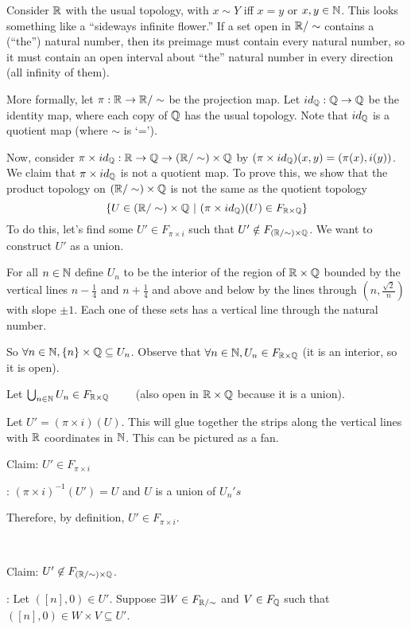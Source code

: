 Consider $\mathbb R$ with the usual topology, with $x\sim Y$ iff $x=y$ or $x,y\in \mathbb N$. This looks something like a ``sideways infinite flower.'' \placeholder If a set open in $\mathbb R/\sim$ contains a (``the'') natural number, then its preimage must contain every natural number, so it must contain an open interval about ``the'' natural number in every direction (all infinity of them). 

More formally, let $\pi:\mathbb R\to\mathbb R/\sim$ be the projection map. Let $id_\mathbb Q:\mathbb Q\to\mathbb Q$ be the identity map, where each copy of $\mathbb Q$ has the usual topology. Note that $id_\mathbb Q$ is a quotient map (where $\sim$ is `='). 

Now, consider $\pi\times id_\mathbb Q:\mathbb R\to\mathbb Q\to(\mathbb R/\sim)\times\mathbb Q$ by $(\pi\times id_\mathbb Q)(x,y) = (\pi(x), i(y))$. We claim that $\pi\times id_\mathbb Q$ is not a quotient map. To prove this, we show that the product topology on $(\mathbb R/\sim)\times\mathbb Q$ is not the same as the quotient topology
\[ \{ U\in (\mathbb R/\sim)\times\mathbb Q\ |\ (\pi\times id_\mathbb Q)(U)\in F_{\mathbb R\times\mathbb Q} \} \]
To do this, let's find some $U' \in F_{\pi \times i}$ such that $U' \notin F_{(\mathbb R/\sim) \times \mathbb Q}$. We want to construct $U'$ as a union.

For all $n\in \mathbb N$ define $U_n$ to be the interior of the region of $\mathbb R\times\mathbb Q$ bounded by the vertical lines $n-\frac{1}{4}$ and $n+\frac{1}{4}$ and above and below by the lines through $(n, \frac{\sqrt{2}}{n})$ with slope $\pm 1$. Each one of these sets has a vertical line through the natural number.

So $\forall n \in \mathbb N, \{n\}\times \mathbb Q \subseteq U_n$. Observe that $\forall n\in \mathbb N, U_n \in F_{\mathbb R\times\mathbb Q}$ (it is an interior, so it is open).

Let $\bigcup_{n \in\mathbb N} U_n \in F_{\mathbb R\times\mathbb Q} \qquad$ (also open in $\mathbb R\times\mathbb Q$ because it is a union).

Let $U' = (\pi \times i)(U).$ This will glue together the strips along the vertical lines with $\mathbb R$ coordinates in $\mathbb N$. This can be pictured as a fan. \placeholder

Claim: $U' \in F_{\pi \times i}$

\proof: $(\pi \times i)^{-1}(U') = U$ and $U$ is a union of $U_n 's$

Therefore, by definition, $U'\in F_{\pi\times i}$.

\mbox{ }

Claim: $U'\not\in F_{(\mathbb R/\sim) \times \mathbb Q}$.

\proof: Let $([n],0) \in U'$. Suppose $\exists W \in F_{\mathbb R/\sim}$ and $V \in F_{\mathbb Q}$ such that $([n], 0)\in W \times V \subseteq U'$.

